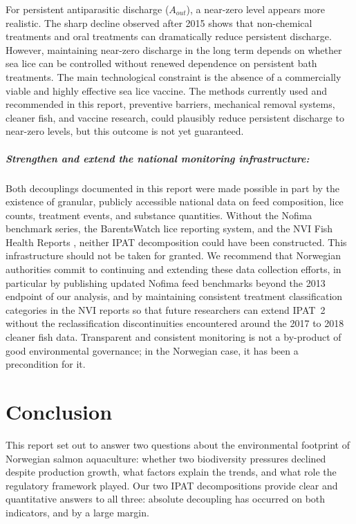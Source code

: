\documentclass[12pt, a4paper]{report}
\begin{document}
For persistent antiparasitic discharge ($A_{out}$), a near-zero level
appears more realistic. The sharp decline observed after 2015 shows
that non-chemical treatments and oral treatments can dramatically reduce
persistent discharge. However, maintaining near-zero discharge in the
long term depends on whether sea lice can be controlled without renewed
dependence on persistent bath treatments. The main technological
constraint is the absence of a commercially viable and highly effective
sea lice vaccine. The methods currently used and recommended in this
report, preventive barriers, mechanical removal systems, cleaner fish,
and vaccine research, could plausibly reduce persistent discharge to
near-zero levels, but this outcome is not yet guaranteed.


\paragraph{Strengthen and extend the national monitoring infrastructure:}
Both decouplings documented in this report were made possible in part
by the existence of granular, publicly accessible national data on feed
composition, lice counts, treatment events, and substance quantities.
Without the Nofima benchmark series, the BarentsWatch \citep{barentswatch} lice reporting
system, and the NVI Fish Health Reports \citep{nvi2019}, neither IPAT decomposition
could have been constructed. This infrastructure should not be taken for
granted. We recommend that Norwegian authorities commit to continuing
and extending these data collection efforts, in particular by publishing
updated Nofima feed benchmarks beyond the 2013 endpoint of our analysis,
and by maintaining consistent treatment classification categories in the
NVI reports so that future researchers can extend IPAT~2 without the
reclassification discontinuities encountered around the 2017 to 2018 cleaner
fish data. Transparent and consistent monitoring is not a by-product of good
environmental governance; in the Norwegian case, it has been a precondition
for it.




\chapter{Conclusion}

This report set out to answer two questions about the environmental footprint of Norwegian salmon aquaculture: whether two biodiversity pressures declined despite production growth, what factors explain the trends, and what role the regulatory framework played. Our two IPAT decompositions provide clear and quantitative answers to all three: absolute decoupling has occurred on both indicators, and by a large margin.
\end{document}
